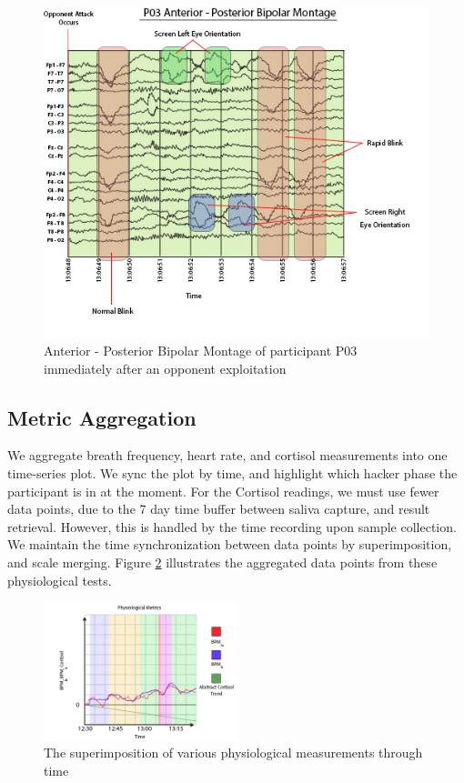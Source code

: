 \documentclass[10pt, titlepage, twocolumn]{article}
\newcommand{\ii}{\indent\indent}
\begin{document}
\begin{figure}[ht]
	\centering
	\includegraphics[width=\textwidth]{eeg}
	\caption{Anterior - Posterior Bipolar Montage of participant P03 immediately after an opponent exploitation}
	\label{eeg}
\end{figure}



\subsection{Metric Aggregation}
\ii
We aggregate breath frequency, heart rate, and cortisol measurements into one time-series plot. We sync the plot by time, and highlight which hacker phase the participant is in at the moment. For the Cortisol readings, we must use fewer data points, due to the 7 day time buffer between saliva capture, and result retrieval. However, this is handled by the time recording upon sample collection. We maintain the time synchronization between data points by superimposition, and scale merging. Figure \ref{agg} illustrates the aggregated data points from these physiological tests.

\begin{figure}[ht]
	\centering
	\includegraphics[width=0.5\textwidth]{agg}
	\caption{The superimposition of various physiological measurements through time}
	\label{agg}
\end{figure}
\end{document}
